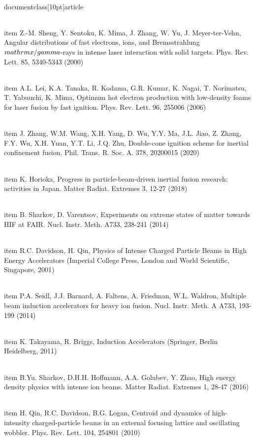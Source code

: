\\documentclass[10pt]{article}
\begin{document}
{{{{{{  \\item Z.-M. Sheng, Y. Sentoku, K. Mima, J. Zhang, W. Yu, J. Meyer-ter-Vehn, Angular distributions of fast electrons, ions, and Bremsstrahlung $\\mathrm{x} / \\gamma$-rays in intense laser interaction with solid targets. Phys. Rev. Lett. 85, 5340-5343 (2000)

  \\item A.L. Lei, K.A. Tanaka, R. Kodama, G.R. Kumar, K. Nagai, T. Norimatsu, T. Yabuuchi, K. Mima, Optimum hot electron production with low-density foams for laser fusion by fast ignition. Phys. Rev. Lett. 96, 255006 (2006)

  \\item J. Zhang, W.M. Wang, X.H. Yang, D. Wu, Y.Y. Ma, J.L. Jiao, Z. Zhang, F.Y. Wu, X.H. Yuan, Y.T. Li, J.Q. Zhu, Double-cone ignition scheme for inertial confinement fusion. Phil. Trans. R. Soc. A. 378, 20200015 (2020)

  \\item K. Horioka, Progress in particle-beam-driven inertial fusion research: activities in Japan. Matter Radiat. Extremes 3, 12-27 (2018)

  \\item B. Sharkov, D. Varentsov, Experiments on extreme states of matter towards HIF at FAIR. Nucl. Instr. Meth. A733, 238-241 (2014)

  \\item R.C. Davidson, H. Qin, Physics of Intense Charged Particle Beams in High Energy Accelerators (Imperial College Press, London and World Scientific, Singapore, 2001)

  \\item P.A. Seidl, J.J. Barnard, A. Faltens, A. Friedman, W.L. Waldron, Multiple beam induction accelerators for heavy ion fusion. Nucl. Instr. Meth. A A733, 193-199 (2014)

  \\item K. Takayama, R. Briggs, Induction Accelerators (Springer, Berlin Heidelberg, 2011)

  \\item B.Yu. Sharkov, D.H.H. Hoffmann, A.A. Golubev, Y. Zhao, High energy density physics with intense ion beams. Matter Radiat. Extremes 1, 28-47 (2016)

  \\item H. Qin, R.C. Davidson, B.G. Logan, Centroid and dynamics of high-intensity charged-particle beams in an external focusing lattice and oscillating wobbler. Phys. Rev. Lett. 104, 254801 (2010)

}}}}}}
\end{document}
